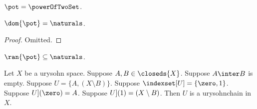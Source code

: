 \begin{abbreviation}\label{pot}
    $\pot = \powerOfTwoSet$.
\end{abbreviation}

\begin{lemma}\label{dom_pot}
    $\dom{\pot} = \naturals$.
\end{lemma}
\begin{proof}
    Omitted.
\end{proof}

\begin{lemma}\label{ran_pot}
    $\ran{\pot} \subseteq \naturals$.
\end{lemma}








\begin{proposition}\label{urysohnchain_induction_begin}
    Let $X$ be a urysohn space.
    Suppose $A,B \in \closeds{X}$.
    Suppose $A \inter B$ is empty.
    Suppose $U = \{A,(X \setminus B)\}$.
    Suppose $\indexset[U]= \{\zero, 1\}$.
    Suppose $\index[U](\zero) = A$.
    Suppose $\index[U](1) = (X \setminus B)$.
    Then $U$ is a urysohnchain in $X$.
\end{proposition}
